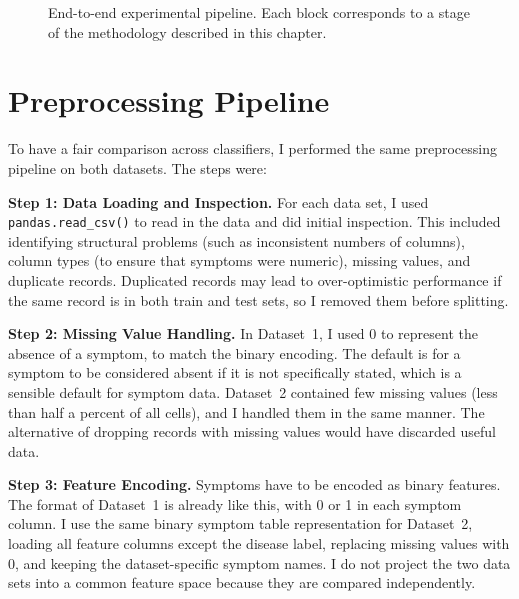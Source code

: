 \begin{figure}[H]
\caption{End-to-end experimental pipeline. Each block corresponds to a stage of the methodology described in this chapter.}
\label{fig:pipeline}
\end{figure}

\section{Preprocessing Pipeline}
\label{sec:preprocessing}

To have a fair comparison across classifiers, I performed the same preprocessing pipeline on both datasets. The steps were:

\textbf{Step 1: Data Loading and Inspection.} For each data set, I used \texttt{pandas.read\_csv()} to read in the data and did initial inspection. This included identifying structural problems (such as inconsistent numbers of columns), column types (to ensure that symptoms were numeric), missing values, and duplicate records. Duplicated records may lead to over-optimistic performance if the same record is in both train and test sets, so I removed them before splitting.

\textbf{Step 2: Missing Value Handling.} In Dataset~1, I used 0 to represent the absence of a symptom, to match the binary encoding. The default is for a symptom to be considered absent if it is not specifically stated, which is a sensible default for symptom data. Dataset~2 contained few missing values (less than half a percent of all cells), and I handled them in the same manner. The alternative of dropping records with missing values would have discarded useful data.

\textbf{Step 3: Feature Encoding.} Symptoms have to be encoded as binary features. The format of Dataset~1 is already like this, with 0 or 1 in each symptom column. I use the same binary symptom table representation for Dataset~2, loading all feature columns except the disease label, replacing missing values with 0, and keeping the dataset-specific symptom names. I do not project the two data sets into a common feature space because they are compared independently.

